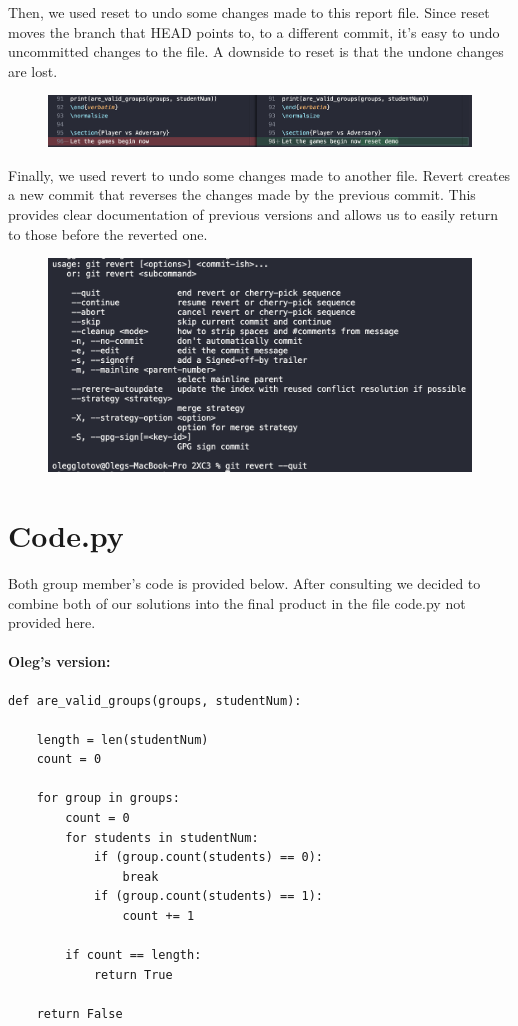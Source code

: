 \documentclass[twocolumn, 10pt]{article}
\begin{document}
Then, we used reset to undo some changes made to this report file. Since reset moves the branch that HEAD points to, to a different commit, it's easy to undo uncommitted changes to the file. A downside to reset is that the undone changes are lost.

\begin{figure}[H]
\includegraphics[width=\linewidth]{reset}
\end{figure}

Finally, we used revert to undo some changes made to another file. Revert creates a new commit that reverses the changes made by the previous commit. This provides clear documentation of previous versions and allows us to easily return to those before the reverted one.

\begin{figure}[H]
\includegraphics[width=\linewidth]{revert}
\end{figure}

\section{Code.py}

Both group member's code is provided below. After consulting we decided to combine both of our solutions into the final product in the file code.py not provided here.

\paragraph{Oleg's version:}

\footnotesize
\begin{verbatim}
def are_valid_groups(groups, studentNum):

    length = len(studentNum)
    count = 0
    
    for group in groups:
        count = 0
        for students in studentNum:
            if (group.count(students) == 0):
                break
            if (group.count(students) == 1):
                count += 1
        
        if count == length:
            return True
        
    return False
\end{verbatim}
\normalsize
\end{document}

